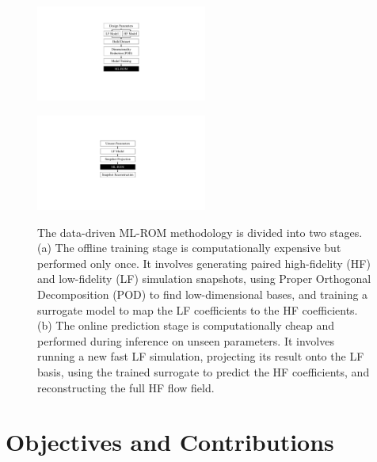 \documentclass[tg, EN]{ufabcFHZh_tg}
\begin{document}
\begin{figure}[H]
    \centering
    \begin{minipage}[c]{0.48\textwidth}
        \centering
        \includegraphics[width=0.5\textwidth]{Figuras/rom_pipeline_a.pdf}
        \label{fig:rom_methodology_a}
    \end{minipage}
    \hfill
    \begin{minipage}[c]{0.48\textwidth}
        \centering
        \includegraphics[width=0.5\textwidth]{Figuras/rom_pipeline_b.pdf}
        \label{fig:rom_methodology_b}
    \end{minipage}
    \caption{The data-driven ML-ROM methodology is divided into two stages. (a) The offline training stage is computationally expensive but performed only once. It involves generating paired high-fidelity (HF) and low-fidelity (LF) simulation snapshots, using Proper Orthogonal Decomposition (POD) to find low-dimensional bases, and training a surrogate model to map the LF coefficients to the HF coefficients. (b) The online prediction stage is computationally cheap and performed during inference on unseen parameters. It involves running a new fast LF simulation, projecting its result onto the LF basis, using the trained surrogate to predict the HF coefficients, and reconstructing the full HF flow field.}
    \label{fig:rom_methodology}
    \end{figure}

\section{Objectives and Contributions}
\end{document}
